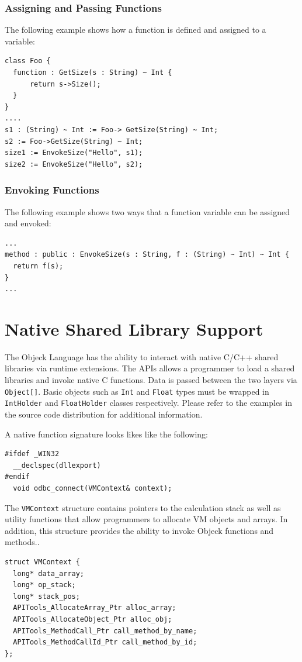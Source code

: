 \documentclass[11pt]{article}
\begin{document}
\subsubsection{Assigning and Passing Functions}
The following example shows how a function is defined and assigned to
a variable:
\begin{verbatim}
class Foo {
  function : GetSize(s : String) ~ Int {
      return s->Size();
  }
}
....
s1 : (String) ~ Int := Foo-> GetSize(String) ~ Int;
s2 := Foo->GetSize(String) ~ Int;
size1 := EnvokeSize("Hello", s1);
size2 := EnvokeSize("Hello", s2);
\end{verbatim}

\subsubsection{Envoking Functions}
The following example shows two ways that a function variable can be
assigned and envoked:
\begin{verbatim}
...
method : public : EnvokeSize(s : String, f : (String) ~ Int) ~ Int {
  return f(s);
}
...
\end{verbatim}

\section{Native Shared Library Support}
The Objeck Language has the ability to interact with native C/C++
shared libraries via runtime 
extensions.  The APIs allows a programmer to load a shared libraries and invoke native C
functions.  Data is passed between the two layers via
\texttt{Object[]}.  Basic objects such as \texttt{Int} and
\texttt{Float} types must be wrapped in \texttt{IntHolder} and
\texttt{FloatHolder} classes respectively.  Please refer to the
examples in the source code distribution for additional information.

A native function signature looks likes like the following:
\begin{verbatim}
#ifdef _WIN32
  __declspec(dllexport)
#endif
  void odbc_connect(VMContext& context);
\end{verbatim}

The \texttt{VMContext} structure contains pointers to the calculation
stack as well as utility functions that allow programmers to 
allocate VM objects and arrays.  In addition, this structure provides the
ability to invoke Objeck functions and methods..  

\begin{verbatim}
struct VMContext {
  long* data_array;
  long* op_stack;
  long* stack_pos;
  APITools_AllocateArray_Ptr alloc_array;
  APITools_AllocateObject_Ptr alloc_obj;
  APITools_MethodCall_Ptr call_method_by_name;
  APITools_MethodCallId_Ptr call_method_by_id;
};
\end{verbatim}
\end{document}
